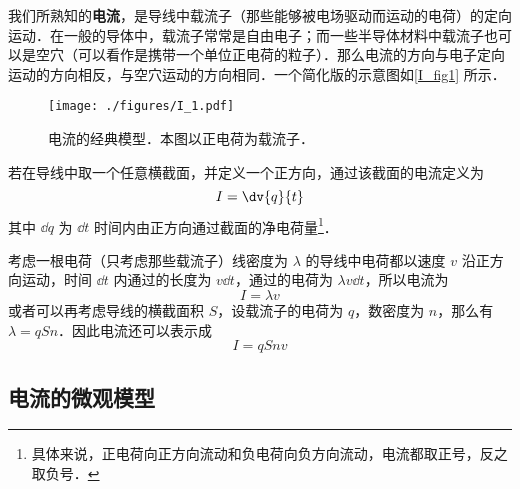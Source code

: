 
\begin{issues}
\issueDraft
\end{issues}


我们所熟知的\textbf{电流}，是导线中载流子（那些能够被电场驱动而运动的电荷）的定向运动．在一般的导体中，载流子常常是自由电子；而一些半导体材料中载流子也可以是空穴（可以看作是携带一个单位正电荷的粒子）．那么电流的方向与电子定向运动的方向相反，与空穴运动的方向相同．一个简化版的示意图如\autoref{I_fig1} 所示．
\begin{figure}[ht]
\centering
\texttt{[image: ./figures/I\_1.pdf]}
\caption{电流的经典模型．本图以正电荷为载流子．} \label{I_fig1}
\end{figure}

若在导线中取一个任意横截面，并定义一个正方向，通过该截面的电流定义为
\begin{equation}\label{I_eq1}
I = \dv{q}{t}
\end{equation}
其中 $\dd{q}$ 为 $\dd{t}$ 时间内由正方向通过截面的净电荷量\footnote{具体来说，正电荷向正方向流动和负电荷向负方向流动，电流都取正号，反之取负号．}．

考虑一根电荷（只考虑那些载流子）线密度为 $\lambda$ 的导线中电荷都以速度 $v$ 沿正方向运动，时间 $\dd{t}$ 内通过的长度为 $v\dd{t}$，通过的电荷为 $\lambda v\dd{t}$，所以电流为
\begin{equation}
I = \lambda v
\end{equation}
或者可以再考虑导线的横截面积 $S$，设载流子的电荷为 $q$，数密度为 $n$，那么有 $\lambda = q S n$．因此电流还可以表示成
\begin{equation}
I = q Snv
\end{equation}
\subsection{电流的微观模型}